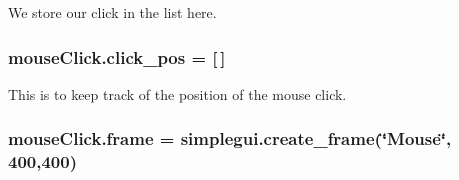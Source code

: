 We store our \textquotesingle{}click\textquotesingle{} in the list here. 

\subsubsection[{\texorpdfstring{click\+\_\+pos}{click\_pos}}]{\setlength{\rightskip}{0pt plus 5cm}mouse\+Click.\+click\+\_\+pos = \mbox{[}$\,$\mbox{]}}\hypertarget{namespacemouseClick_a56650027db7949d822274f7fa9f7db68}{}\label{namespacemouseClick_a56650027db7949d822274f7fa9f7db68}


This is to keep track of the position of the mouse click. 

\subsubsection[{\texorpdfstring{frame}{frame}}]{\setlength{\rightskip}{0pt plus 5cm}mouse\+Click.\+frame = simplegui.\+create\+\_\+frame(\char`\"{}Mouse\char`\"{}, 400,400)}\hypertarget{namespacemouseClick_a24bd188bbe2a1501d1d8553a8a4457d8}{}\label{namespacemouseClick_a24bd188bbe2a1501d1d8553a8a4457d8}
